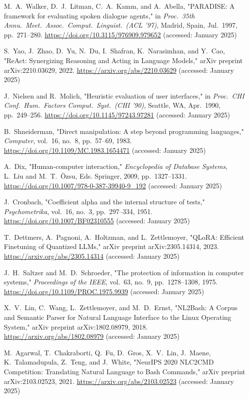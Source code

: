 \documentclass[a4paper,12pt]{article}
\begin{document}
\begin{thebibliography}{30}
 M.~A.~Walker, D.~J.~Litman, C.~A.~Kamm, and A.~Abella, "PARADISE: A framework for evaluating spoken dialogue agents," in \textit{Proc.~35th Annu.~Meet.~Assoc.~Comput.~Linguist.~(ACL '97)}, Madrid, Spain, Jul.~1997, pp.~271--280. \url{https://doi.org/10.3115/976909.979652} (accessed: January 2025)

 S.~Yao, J.~Zhao, D.~Yu, N.~Du, I.~Shafran, K.~Narasimhan, and Y.~Cao, "ReAct: Synergizing Reasoning and Acting in Language Models," arXiv preprint arXiv:2210.03629, 2022. \url{https://arxiv.org/abs/2210.03629} (accessed: January 2025)

 J.~Nielsen and R.~Molich, "Heuristic evaluation of user interfaces," in \textit{Proc.~CHI Conf.~Hum.~Factors Comput.~Syst.~(CHI '90)}, Seattle, WA, Apr.~1990, pp.~249--256. \url{https://doi.org/10.1145/97243.97281} (accessed: January 2025)

 B.~Shneiderman, "Direct manipulation: A step beyond programming languages," \textit{Computer}, vol.~16, no.~8, pp.~57--69, 1983. \url{https://doi.org/10.1109/MC.1983.1654471} (accessed: January 2025)

 A.~Dix, "Human-computer interaction," \textit{Encyclopedia of Database Systems}, L.~Liu and M.~T.~Özsu, Eds. Springer, 2009, pp.~1327--1331. \url{https://doi.org/10.1007/978-0-387-39940-9_192} (accessed: January 2025)

 J.~Cronbach, "Coefficient alpha and the internal structure of tests," \textit{Psychometrika}, vol.~16, no.~3, pp.~297--334, 1951. \url{https://doi.org/10.1007/BF02310555} (accessed: January 2025)

 T.~Dettmers, A.~Pagnoni, A.~Holtzman, and L.~Zettlemoyer, "QLoRA: Efficient Finetuning of Quantized LLMs," arXiv preprint arXiv:2305.14314, 2023. \url{https://arxiv.org/abs/2305.14314} (accessed: January 2025)

 J.~H.~Saltzer and M.~D.~Schroeder, "The protection of information in computer systems," \textit{Proceedings of the IEEE}, vol.~63, no.~9, pp.~1278--1308, 1975. \url{https://doi.org/10.1109/PROC.1975.9939} (accessed: January 2025)

 X.~V.~Lin, C.~Wang, L.~Zettlemoyer, and M.~D.~Ernst, "NL2Bash: A Corpus and Semantic Parser for Natural Language Interface to the Linux Operating System," arXiv preprint arXiv:1802.08979, 2018. \url{https://arxiv.org/abs/1802.08979} (accessed: January 2025)

 M.~Agarwal, T.~Chakraborti, Q.~Fu, D.~Gros, X.~V.~Lin, J.~Maene, K.~Talamadupula, Z.~Teng, and J.~White, "NeurIPS 2020 NLC2CMD Competition: Translating Natural Language to Bash Commands," arXiv preprint arXiv:2103.02523, 2021. \url{https://arxiv.org/abs/2103.02523} (accessed: January 2025)


\end{thebibliography}
\end{document}
